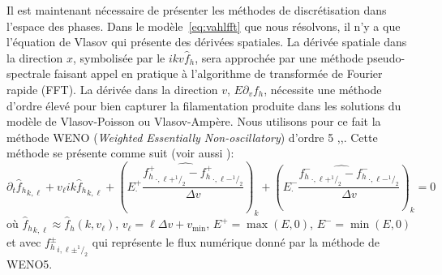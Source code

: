 Il est maintenant nécessaire de présenter les méthodes de discrétisation dans l'espace des phases. Dans le modèle~\eqref{eq:vahlfft} que nous résolvons, il n'y a que l'équation de Vlasov qui présente des dérivées spatiales. La dérivée spatiale dans la direction $x$, symbolisée par le $ikv\hat{f}_h$, sera approchée par une méthode pseudo-spectrale faisant appel en pratique à l'algorithme de transformée de Fourier rapide (FFT). La dérivée dans la direction $v$, $E\partial_v f_h$, nécessite une méthode d'ordre élevé pour bien capturer la filamentation produite dans les solutions du modèle de Vlasov-Poisson ou Vlasov-Ampère. Nous utilisons pour ce fait la méthode WENO (\emph{Weighted Essentially Non-oscillatory}) d'ordre 5 \cite{Shu:2003},\cite{Liu:1994},\cite{Wang:2007}. Cette méthode se présente comme suit (voir aussi \cite{Crouseilles:2019b}):
$$
  \partial_t \left.\hat{f}_h\right._{k,\ell}
  + v_\ell ik\left.\hat{f}_h\right._{k,\ell}
  + \left(\widehat{ E_\cdot^+ \frac{\left.f^+_h\right._{\cdot,\ell+^1/_2}-\left.f^+_h\right._{\cdot,\ell-^1/_2}}{\Delta v} }\right)_k
  + \left(\widehat{ E_\cdot^- \frac{\left.f^-_h\right._{\cdot,\ell+^1/_2}-\left.f^-_h\right._{\cdot,\ell-^1/_2}}{\Delta v} }\right)_k
  = 0
$$
où $\left.\hat{f}_h\right._{k,\ell} \approx \left.\hat{f}_h\right.(k,v_\ell)$, $v_\ell = \ell\Delta v + v_{\text{min}}$, $E^+ = \max(E,0)$, $E^- = \min(E,0)$ et avec ${f^\pm_h}_{i,\ell\pm^1/_2}$ qui représente le flux numérique donné par la méthode de WENO5.

